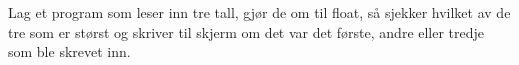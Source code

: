 %
%
Lag et program som leser inn tre tall, gjør de om til float, så sjekker hvilket av de tre som er størst og skriver til skjerm om det var det første, andre eller tredje som ble skrevet inn.
